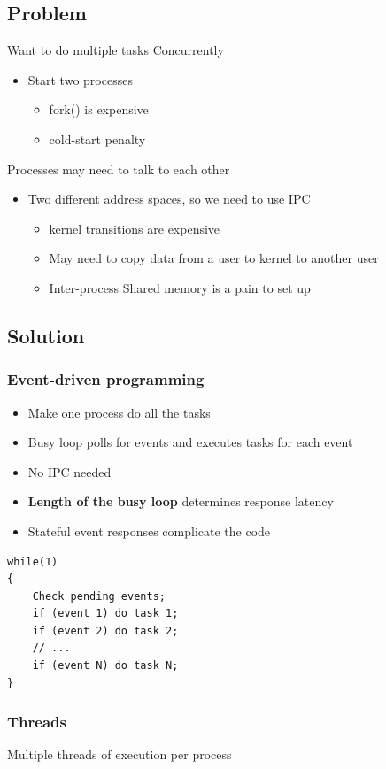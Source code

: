 \documentclass[12pt]{article}
\begin{document}
\subsection{Problem}
Want to do multiple tasks Concurrently
\begin{itemize}
    \item Start two processes \begin{itemize}
        \item fork() is expensive
        \item cold-start penalty
    \end{itemize}
\end{itemize}
Processes may need to talk to each other
\begin{itemize}
    \item Two different address spaces, so we need to use IPC \begin{itemize}
        \item kernel transitions are expensive
        \item May need to copy data from a user to kernel to another user
        \item Inter-process Shared memory is a pain to set up
    \end{itemize}
\end{itemize}
\subsection{Solution}
\subsubsection{Event-driven programming}
\begin{itemize}
    \item Make one process do all the tasks 
    \item Busy loop polls for events and executes tasks for each event 
    \item No IPC needed 
    \item {\bfseries Length of the busy loop} determines response latency 
    \item Stateful event responses complicate the code
\end{itemize}
\begin{lstlisting}
while(1) 
{ 
    Check pending events; 
    if (event 1) do task 1; 
    if (event 2) do task 2; 
    // ...
    if (event N) do task N; 
}
\end{lstlisting}
\subsubsection{Threads}
Multiple threads of execution per process
\end{document}
